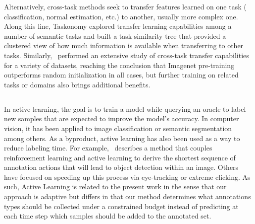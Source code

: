 Alternatively, cross-task methods seek to transfer features learned on one task (\eg~ classification, normal estimation, etc.) to another, usually more complex one. Along this line, Taskonomy explored transfer learning capabilities among a number of semantic tasks and built a task similarity tree that provided a clustered view of how much information is available when transferring to other tasks. Similarly,~ performed an extensive study of cross-task transfer capabilities for a variety of datasets, reaching the conclusion that Imagenet pre-training outperforms random initialization in all cases, but further training on related tasks or domains also brings additional benefits.

\subsection{}
In active learning, the goal is to train a model while querying an oracle to label new samples that are expected to improve the model's accuracy. In computer vision, it has been applied to image classification or semantic segmentation among others. As a byproduct, active learning has also been used as a way to reduce labeling time. For example,~ describes a method that couples reinforcement learning and active learning to derive the shortest sequence of annotation actions that will lead to object detection within an image. Others have focused on speeding up this process via eye-tracking or extreme clicking. As such, Active Learning is related to the present work in the sense that our approach is adaptive but differs in that our method determines what annotations types should be collected under a constrained budget instead of predicting at each time step which samples should be added to the annotated set.